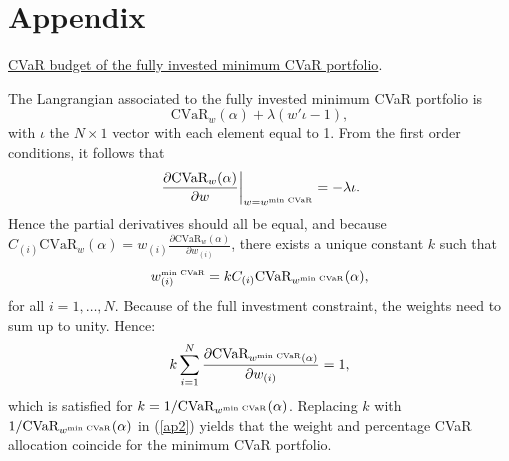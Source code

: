 \documentclass[12pt,a4paper]{article}
\begin{document}
\newpage

\section{Appendix \label{sec:Appendix}}

\noindent \underline{CVaR budget of the fully invested minimum CVaR portfolio}.

The Langrangian associated to the fully invested minimum CVaR portfolio is
\begin{equation}  \mbox{CVaR}_w(\alpha) + \lambda ( w'\iota - 1 ),\end{equation}
with $\iota$ the $N\times 1$ vector with each element equal to 1.
From the first order conditions, it follows that
\begin{equation}  \left.\frac{ \partial \mbox{CVaR}_w(\alpha)}{\partial w}\right|_{w=w^{\mbox{\tiny min CVaR}}} = -\lambda \iota. \label{ap1}\end{equation}
Hence the partial derivatives should all be equal, and because $C_{(i)} \mbox{CVaR}_w(\alpha)= w_{(i)}\frac{ \partial \mbox{CVaR}_w(\alpha)}{\partial w_{(i)}} $, there exists a unique constant $k$ such that
\begin{equation} w_{(i)}^{\mbox{\tiny min CVaR}} = k C_{(i)} \mbox{CVaR}_{w^{\mbox{\tiny min CVaR}}}(\alpha), \label{ap2}\end{equation} for all $i=1,\ldots,N$.
Because of the full investment constraint, the weights need to sum up to unity. Hence:
 \begin{equation} k \sum_{i=1}^N \frac{ \partial \mbox{CVaR}_{w^{\mbox{\tiny min CVaR}}(\alpha)}}{\partial w_{(i)}} = 1, \label{ap3}\end{equation}
which is satisfied for $k=1/\mbox{CVaR}_{w^{\mbox{\tiny min CVaR}}}(\alpha)$. Replacing $k$ with $1/\mbox{CVaR}_{w^{\mbox{\tiny min CVaR}}}(\alpha)$ in (\ref{ap2}) yields that the weight and percentage CVaR allocation coincide for the minimum CVaR portfolio.



\end{document}
